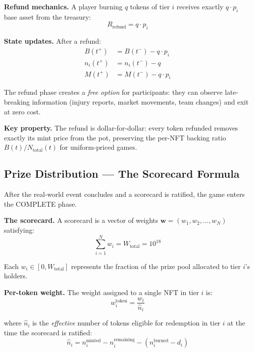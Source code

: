 \documentclass[11pt,a4paper]{article}
\begin{document}
\textbf{Refund mechanics.} A player burning $q$ tokens of tier $i$ receives exactly $q \cdot p_i$ base asset from the treasury:
\begin{equation}
R_{\text{refund}} = q \cdot p_i
\end{equation}

\textbf{State updates.} After a refund:
\begin{align}
B(t^+) &= B(t^-) - q \cdot p_i \\
n_i(t^+) &= n_i(t^-) - q \\
M(t^+) &= M(t^-) - q \cdot p_i
\end{align}

The refund phase creates a \emph{free option} for participants: they can observe late-breaking information (injury reports, market movements, team changes) and exit at zero cost.

\textbf{Key property.} The refund is dollar-for-dollar: every token refunded removes exactly its mint price from the pot, preserving the per-NFT backing ratio $B(t) / N_{\text{total}}(t)$ for uniform-priced games.

\subsection{Prize Distribution --- The Scorecard Formula}

After the real-world event concludes and a scorecard is ratified, the game enters the COMPLETE phase.

\textbf{The scorecard.} A scorecard is a vector of weights $\mathbf{w} = (w_1, w_2, \ldots, w_N)$ satisfying:
\begin{equation}
\sum_{i=1}^{N} w_i = W_{\text{total}} = 10^{18}
\end{equation}

Each $w_i \in [0, W_{\text{total}}]$ represents the fraction of the prize pool allocated to tier $i$'s holders.

\textbf{Per-token weight.} The weight assigned to a single NFT in tier $i$ is:
\begin{equation}
w_i^{\text{token}} = \frac{w_i}{\hat{n}_i}
\end{equation}

where $\hat{n}_i$ is the \emph{effective} number of tokens eligible for redemption in tier $i$ at the time the scorecard is ratified:
\begin{equation}
\hat{n}_i = n_i^{\text{minted}} - n_i^{\text{remaining}} - (n_i^{\text{burned}} - d_i)
\end{equation}
\end{document}
